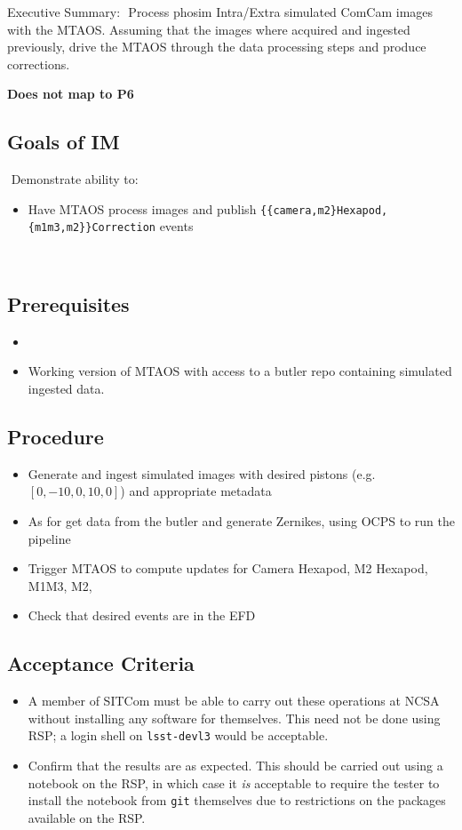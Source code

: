Executive Summary:
​
Process phosim Intra/Extra simulated ComCam images with the MTAOS.
Assuming that the images where acquired and ingested previously, drive the MTAOS through the data processing steps and produce corrections.

\textbf{Does not map to P6}
​
\subsection{Goals of IM}
​
Demonstrate ability to:
​
\begin{itemize}
\item Have MTAOS process images and publish
  \texttt{\{\{camera,m2\}Hexapod,\{m1m3,m2\}\}Correction} events
\end{itemize}
​
\subsection{Prerequisites}
\begin{itemize}
\item {}
\item Working version of MTAOS with access to a butler repo containing simulated ingested data.
\end{itemize}

\subsection{Procedure}
\begin{itemize}
\item Generate and ingest simulated images with desired pistons (e.g. $[0, -10, 0, 10, 0]$) and appropriate
  metadata
\item As for  get data from the butler and generate Zernikes, using OCPS to run the pipeline
\item Trigger MTAOS to compute updates for Camera Hexapod, M2 Hexapod, M1M3, M2, 
\item Check that desired events are in the EFD
\end{itemize}

\subsection{Acceptance Criteria}
\begin{itemize}
\item A member of SITCom must be able to carry out these operations at NCSA without installing any
  software for themselves.  This need not be done using RSP; a login shell on \eg \texttt{lsst-devl3}
  would be acceptable.
\item Confirm that the results are as expected.  This should be carried out using a notebook on the RSP,
  in which case it \textit{is} acceptable to require the tester to install the notebook from \texttt{git}
  themselves due to restrictions on the packages available on the RSP.
\end{itemize}
